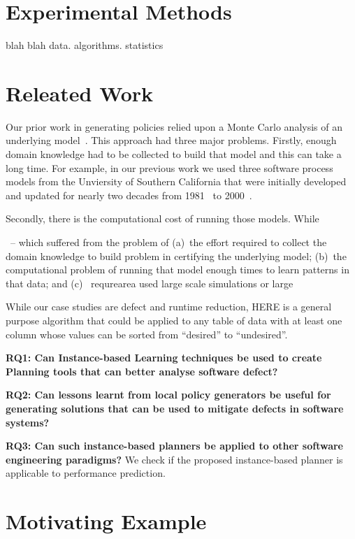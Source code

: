 \documentclass[conference]{IEEEtran}
\begin{document}
{\section{Experimental Methods}

blah blah data. algorithms. statistics

\section{Releated Work}

Our prior work in generating policies relied upon a Monte Carlo
analysis of an underlying model~\cite{me07f}. This approach had three major problems.
Firstly, enough domain knowledge had to be collected to build that model
and this can take a long time. For example, in our previous work we used three software process models from
the Unviersity of Southern California that were initially
developed and updated for nearly two decades from 1981~\cite{boehm81} to 2000~\cite{boehm00b}.

Secondly, there is the computational cost of running those models.
While 

~\cite{}-- which suffered from the problem of (a)~the effort required to collect the domain knowledge to build
problem in certifying the underlying model;
 (b)~the computational problem of running that model enough
times to learn patterns in that data; and (c)~ requrearea used large scale simulations or large


While
our case studies are defect and runtime reduction, HERE is a general
purpose algorithm that could be applied to any table of data with at least
one column whose values can be sorted from ``desired'' to ``undesired''.



{\bf RQ1: Can Instance-based Learning techniques be used to create Planning tools that can better analyse software defect?} 


{\bf RQ2: Can lessons learnt from local policy generators be useful for generating solutions that can be used to mitigate defects in software systems?} 

{\bf RQ3: Can such instance-based planners be applied to other software engineering paradigms?}
We check if the proposed instance-based planner is applicable to performance prediction.

\section{Motivating Example}
}
\end{document}
